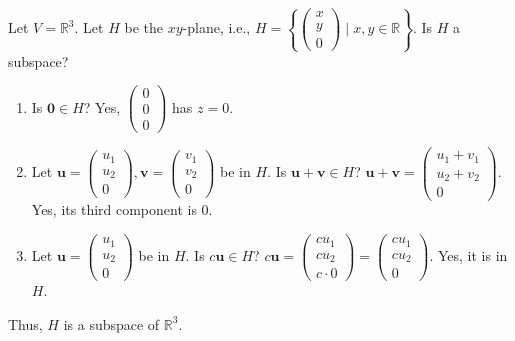 \documentclass[oneside]{book}
\begin{document}
\begin{example}[A subspace]
Let $V = \mathbb{R}^3$. Let $H$ be the $xy$-plane, i.e., $H = \left\{ \begin{pmatrix} x \\ y \\ 0 \end{pmatrix} \mid x, y \in \mathbb{R} \right\}$.
Is $H$ a subspace?
\begin{enumerate}
    \item Is $\mathbf{0} \in H$? Yes, $\begin{pmatrix} 0 \\ 0 \\ 0 \end{pmatrix}$ has $z=0$.
    \item Let $\mathbf{u} = \begin{pmatrix} u_1 \\ u_2 \\ 0 \end{pmatrix}, \mathbf{v} = \begin{pmatrix} v_1 \\ v_2 \\ 0 \end{pmatrix}$ be in $H$.
    Is $\mathbf{u} + \mathbf{v} \in H$? $\mathbf{u} + \mathbf{v} = \begin{pmatrix} u_1+v_1 \\ u_2+v_2 \\ 0 \end{pmatrix}$. Yes, its third component is 0.
    \item Let $\mathbf{u} = \begin{pmatrix} u_1 \\ u_2 \\ 0 \end{pmatrix}$ be in $H$. Is $c\mathbf{u} \in H$?
    $c\mathbf{u} = \begin{pmatrix} cu_1 \\ cu_2 \\ c \cdot 0 \end{pmatrix} = \begin{pmatrix} cu_1 \\ cu_2 \\ 0 \end{pmatrix}$. Yes, it is in $H$.
\end{enumerate}
Thus, $H$ is a subspace of $\mathbb{R}^3$.
\end{example}
\end{document}
